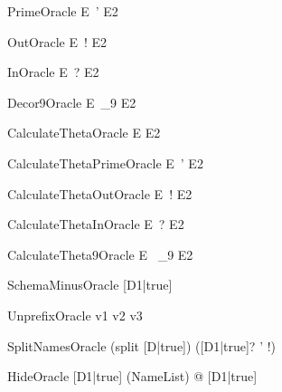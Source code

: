 \documentclass{article}
\newcommand{\unprefix}{\mathrel{unprefix}}
\begin{document}
\begin{zedoracle}{PrimeOracle}
  E~' \is E2
\end{zedoracle}

\begin{zedoracle}{OutOracle}
  E~! \is E2
\end{zedoracle}

\begin{zedoracle}{InOracle}
  E~? \is E2
\end{zedoracle}

\begin{zedoracle}{Decor9Oracle}
  E~_9 \is E2
\end{zedoracle}

\begin{zedoracle}{CalculateThetaOracle}
  \theta E \is E2
\end{zedoracle}

\begin{zedoracle}{CalculateThetaPrimeOracle}
  \theta E~' \is E2
\end{zedoracle}

\begin{zedoracle}{CalculateThetaOutOracle}
  \theta E~! \is E2
\end{zedoracle}

\begin{zedoracle}{CalculateThetaInOracle}
  \theta E~? \is E2
\end{zedoracle}

\begin{zedoracle}{CalculateTheta9Oracle}
  \theta E~ _9 \is E2
\end{zedoracle}

\begin{zedoracle}{SchemaMinusOracle}
  [D1|true] \schemaminus [D2|true] \is [D3|true]
\end{zedoracle}

\begin{zedoracle}{UnprefixOracle}
  v1 \unprefix v2 \is v3
\end{zedoracle}

\begin{zedoracle}{SplitNamesOracle}
  (split [D|true]) \is ([D1|true]? \land [D2|true] \land
                        [D3|true]' \land [D4|true]!)
\end{zedoracle}

\begin{zedoracle}{HideOracle}
  [D1|true] \hide (NameList) \is \exists [D2|true] @ [D1|true]
\end{zedoracle}
\end{document}
